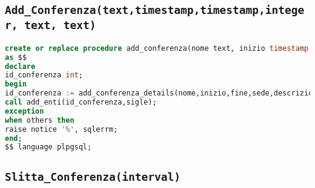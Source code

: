 \subsection{\texttt{Add\_Conferenza(text,timestamp,timestamp,integer, text, text)}}
\begin{lstlisting}[language=SQL,style=mystyle]
create or replace procedure add_conferenza(nome text, inizio timestamp, fine timestamp, sede integer, descrizione text, sigle text)
as $$
declare
id_conferenza int;
begin
id_conferenza := add_conferenza_details(nome,inizio,fine,sede,descrizione);
call add_enti(id_conferenza,sigle);
exception
when others then
raise notice '%', sqlerrm;
end;
$$ language plpgsql;
\end{lstlisting}
\subsection{\texttt{Slitta\_Conferenza(interval)}}
